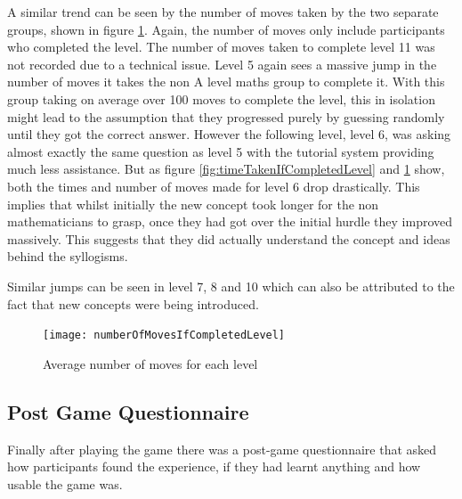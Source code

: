 \documentclass[12pt,a4paper]{report}
\begin{document}
A similar trend can be seen by the number of moves taken by the two separate groups, shown in figure \ref{fig:numberOfMovesIfCompletedLevel}. Again, the number of moves only include participants who completed the level. The number of moves taken to complete level 11 was not recorded due to a technical issue. Level 5 again sees a massive jump in the number of moves it takes the non A level maths group to complete it. With this group taking on average over 100 moves to complete the level, this in isolation might lead to the assumption that they progressed purely by guessing randomly until they got the correct answer. However the following level, level 6, was asking almost exactly the same question as level 5 with the tutorial system providing much less assistance. But as figure  \ref{fig:timeTakenIfCompletedLevel} and \ref{fig:numberOfMovesIfCompletedLevel} show, both the times and number of moves made for level 6 drop drastically. This implies that whilst initially the new concept took longer for the non mathematicians to grasp, once they had got over the initial hurdle they improved massively. This suggests that they did actually understand the concept and ideas behind the syllogisms. 

Similar jumps can be seen in level 7, 8 and 10 which can also be attributed to the fact that new concepts were being introduced.

\begin{figure}[h]
\centering
    \texttt{[image: numberOfMovesIfCompletedLevel]}
    \caption{Average number of moves for each level}
        \label{fig:numberOfMovesIfCompletedLevel}
\end{figure}
\FloatBarrier

\subsection{Post Game Questionnaire}
Finally after playing the game there was a post-game questionnaire that asked how participants found the experience, if they had learnt anything and how usable the game was.
\end{document}
